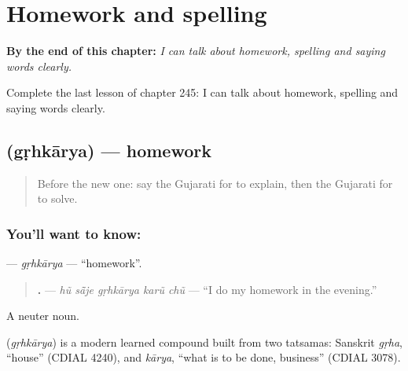 
\chapter{Homework and spelling}
\label{ch:gu-homework-and-spelling}

\begin{chapteropening}
\textbf{By the end of this chapter:} \emph{I can talk about homework, spelling and saying words clearly.}

Complete the last lesson of chapter 245: I can talk about homework, spelling and saying words clearly.
\end{chapteropening}

\section[\texorpdfstring{\gu{ગૃહકાર્ય} (gṛhkārya)}{ગૃહકાર્ય (gṛhkārya)}]{ (gṛhkārya) — homework}

\label{lesson:GU-C245-grhkarya}



\begin{quote}
Before the new one: say the Gujarati for to explain, then the Gujarati for to solve.
\end{quote}

\subsection*{You'll want to know: }
\textbf{} — \emph{gṛhkārya} — \textquotedblleft{}homework\textquotedblright{}.

\begin{quote}
\textbf{    .} — \emph{hũ sā̃je gṛhkārya karũ chũ} — \textquotedblleft{}I do my homework in the evening.\textquotedblright{}
\end{quote}

A neuter noun.

\begin{cousinweb}
\textbf{} (\emph{gṛhkārya}) is a modern learned compound built from two tatsamas: Sanskrit \emph{gṛha}, \textquotedblleft{}house\textquotedblright{} (CDIAL 4240), and \emph{kārya}, \textquotedblleft{}what is to be done, business\textquotedblright{} (CDIAL 3078).
\end{cousinweb}

